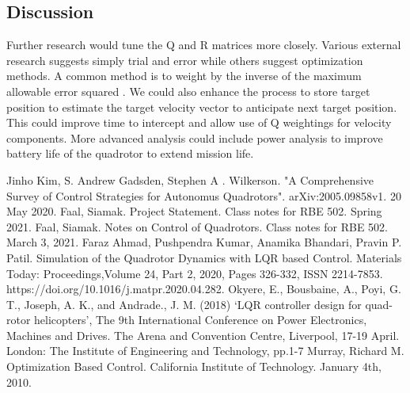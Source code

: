 \documentclass{article}
\begin{document}
\begin{multicols}{2}
\section*{Discussion}
Further research would tune the Q and R matrices more closely.  Various external research suggests simply trial and error while others suggest optimization methods. A common method is to weight by the inverse of the maximum allowable error squared \cite{mur}.  We could also enhance the process to store target position to estimate the target velocity vector to anticipate next target position.  This could improve time to intercept and allow use of Q weightings for velocity components. More advanced analysis could include power analysis to improve battery life of the quadrotor to extend mission life.  
\label{References}

\begin{thebibliography}{10}
Jinho Kim, S. Andrew Gadsden, Stephen A . Wilkerson.
"A Comprehensive Survey of Control Strategies for Autonomus Quadrotors".
arXiv:2005.09858v1.
20 May 2020.
Faal, Siamak. Project Statement.  Class notes for RBE 502. Spring 2021.
Faal, Siamak. Notes on Control of Quadrotors. Class notes for RBE 502. March 3, 2021.
Faraz Ahmad, Pushpendra Kumar, Anamika Bhandari, Pravin P. Patil.
Simulation of the Quadrotor Dynamics with LQR based Control.
Materials Today: Proceedings,Volume 24, Part 2, 2020, Pages 326-332,
ISSN 2214-7853.
https://doi.org/10.1016/j.matpr.2020.04.282.
Okyere, E., Bousbaine, A., Poyi, G. T., Joseph, A. K., and Andrade.,
J. M. (2018) ‘LQR controller design for quad-rotor helicopters’,
The 9th International Conference on Power Electronics, Machines
and Drives. The Arena and Convention Centre, Liverpool, 17-19
April. London: The Institute of Engineering and Technology, pp.1-7
Murray, Richard M. Optimization Based Control.  California Institute of Technology. January 4th, 2010.




\end{thebibliography}

\end{multicols}
\end{document}
